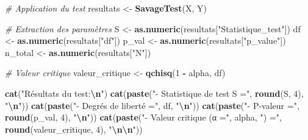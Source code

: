 \documentclass[
  12pt,
]{article}
\newenvironment{Shaded}{\begin{snugshade}}{\end{snugshade}}
\newcommand{\CommentTok}[1]{\textcolor[rgb]{0.56,0.35,0.01}{\textit{#1}}}
\newcommand{\DecValTok}[1]{\textcolor[rgb]{0.00,0.00,0.81}{#1}}
\newcommand{\FunctionTok}[1]{\textcolor[rgb]{0.13,0.29,0.53}{\textbf{#1}}}
\newcommand{\NormalTok}[1]{#1}
\newcommand{\OtherTok}[1]{\textcolor[rgb]{0.56,0.35,0.01}{#1}}
\newcommand{\SpecialCharTok}[1]{\textcolor[rgb]{0.81,0.36,0.00}{\textbf{#1}}}
\newcommand{\StringTok}[1]{\textcolor[rgb]{0.31,0.60,0.02}{#1}}
\begin{document}
\begin{Shaded}
\begin{Highlighting}[]
  \CommentTok{\# Application du test}
\NormalTok{  resultats }\OtherTok{\textless{}{-}} \FunctionTok{SavageTest}\NormalTok{(X, Y)}
  
  \CommentTok{\# Extraction des paramètres}
\NormalTok{  S }\OtherTok{\textless{}{-}} \FunctionTok{as.numeric}\NormalTok{(resultats[}\StringTok{"Statistique\_test"}\NormalTok{])}
\NormalTok{  df }\OtherTok{\textless{}{-}} \FunctionTok{as.numeric}\NormalTok{(resultats[}\StringTok{"df"}\NormalTok{])}
\NormalTok{  p\_val }\OtherTok{\textless{}{-}} \FunctionTok{as.numeric}\NormalTok{(resultats[}\StringTok{"p\_value"}\NormalTok{])}
\NormalTok{  n\_total }\OtherTok{\textless{}{-}} \FunctionTok{as.numeric}\NormalTok{(resultats[}\StringTok{"N"}\NormalTok{])}
  
  \CommentTok{\# Valeur critique}
\NormalTok{  valeur\_critique }\OtherTok{\textless{}{-}} \FunctionTok{qchisq}\NormalTok{(}\DecValTok{1} \SpecialCharTok{{-}}\NormalTok{ alpha, df)}
  
  \FunctionTok{cat}\NormalTok{(}\StringTok{"Résultats du test:}\SpecialCharTok{\textbackslash{}n}\StringTok{"}\NormalTok{)}
  \FunctionTok{cat}\NormalTok{(}\FunctionTok{paste}\NormalTok{(}\StringTok{"{-} Statistique de test S ="}\NormalTok{, }\FunctionTok{round}\NormalTok{(S, }\DecValTok{4}\NormalTok{), }\StringTok{"}\SpecialCharTok{\textbackslash{}n}\StringTok{"}\NormalTok{))}
  \FunctionTok{cat}\NormalTok{(}\FunctionTok{paste}\NormalTok{(}\StringTok{"{-} Degrés de liberté ="}\NormalTok{, df, }\StringTok{"}\SpecialCharTok{\textbackslash{}n}\StringTok{"}\NormalTok{))}
  \FunctionTok{cat}\NormalTok{(}\FunctionTok{paste}\NormalTok{(}\StringTok{"{-} P{-}valeur ="}\NormalTok{, }\FunctionTok{round}\NormalTok{(p\_val, }\DecValTok{4}\NormalTok{), }\StringTok{"}\SpecialCharTok{\textbackslash{}n}\StringTok{"}\NormalTok{))}
  \FunctionTok{cat}\NormalTok{(}\FunctionTok{paste}\NormalTok{(}\StringTok{"{-} Valeur critique (α ="}\NormalTok{, alpha, }\StringTok{") ="}\NormalTok{, }\FunctionTok{round}\NormalTok{(valeur\_critique, }\DecValTok{4}\NormalTok{), }\StringTok{"}\SpecialCharTok{\textbackslash{}n\textbackslash{}n}\StringTok{"}\NormalTok{))}
  

\end{Highlighting}
\end{Shaded}
\end{document}
